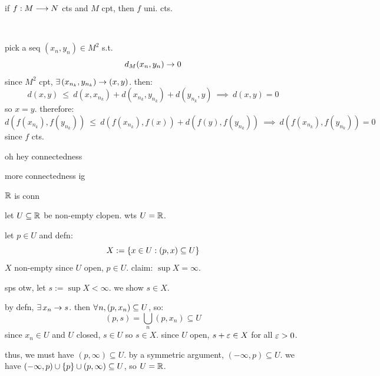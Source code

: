 \begin{thm}
    if $f:M\longrightarrow N$ cts and $M$ cpt, then $f$ uni. cts.
\end{thm} \

\begin{pf}[source=Primary Source Material]
    pick a seq $(x_{n},y_{n})\in M^{2}$ s.t.
	\begin{equation*}
	    d_{M}(x_{n},y_{n})\rightarrow0
	\end{equation*}
	since $M^{2}$ cpt, $\ex(x_{n_{k}},y_{n_{k}})\sto(x,y)$. then:
	\begin{equation*}
	    d(x,y) \ \leq \ d(x,x_{n_{k}})+d(x_{n_{k}},y_{n_{k}})+d(y_{n_{k}},y)
		\ \implies \ d(x,y)=0
	\end{equation*}
	so $x=y$. therefore:
	\begin{equation*}
	    d(f(x_{n_{k}}),f(y_{n_{k}})) \ \leq \
		d(f(x_{n_{k}}),f(x)) + d(f(y),f(y_{n_{k}})) \ \implies \
		d(f(x_{n_{k}}),f(y_{n_{k}})) = 0
	\end{equation*}
	since $f$ cts.
\end{pf}

oh hey connectedness

more connectedness ig

\newpage
\begin{thm}
    $\mathbb{R}$ is conn
\end{thm}

\begin{pf}[source=Primary Source Material]
    let $U\subseteq\mathbb{R}$ be non-empty clopen. wts $U=\mathbb{R}$.

	let $p\in U$ and defn:
	\begin{equation*}
	    X:=\left\{{x\in U:(p,x)\subseteq U}\right\}
	\end{equation*}
	$X$ non-empty since $U$ open, $p\in U$. claim: $\sup X=\infty$.
	\begin{block}
	    sps otw, let $s:=\sup X<\infty$. we show $s \in X$.

		by defn, $\ex x_{n}\sto s$.
		then $\fa n, (p,x_{n})\subseteq U$, so:
		\begin{equation*}
			(p,s)=\bigcup_{n}(p,x_{n})\subseteq U
		\end{equation*}
		since $x_{n}\in U$ and $U$ closed, $s \in U$ so $s \in X$.
		since $U$ open, $s + \varepsilon\in X$ for all $\varepsilon>0$.
	\end{block}
	thus, we must have $(p,\infty)\subseteq U$.
	by a symmetric argument, $(-\infty,p)\subseteq U$. we have
	$ (-\infty,p)\cup\left\{{p}\right\}\cup(p,\infty)\subseteq U $, so $U=\mathbb{R}$.
\end{pf}

